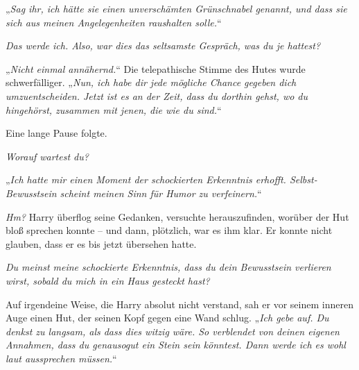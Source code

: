 „\emph{Sag ihr, ich hätte sie einen unverschämten Grünschnabel genannt, und dass sie sich aus meinen Angelegenheiten raushalten solle.}“

\emph{Das werde ich. Also, war dies das seltsamste Gespräch, was du je hattest? }

„\emph{Nicht einmal annähernd.}“ Die telepathische Stimme des Hutes wurde schwerfälliger. „\emph{Nun, ich habe dir jede mögliche Chance gegeben dich umzuentscheiden. Jetzt ist es an der Zeit, dass du dorthin gehst, wo du hingehörst, zusammen mit jenen, die wie du sind.}“

Eine lange Pause folgte.

\emph{Worauf wartest du? }

„\emph{Ich hatte mir einen Moment der schockierten Erkenntnis erhofft. Selbst-Bewusstsein scheint meinen Sinn für Humor zu verfeinern.}“

\emph{Hm?} Harry überflog seine Gedanken, versuchte herauszufinden, worüber der Hut bloß sprechen konnte – und dann, plötzlich, war es ihm klar. Er konnte nicht glauben, dass er es bis jetzt übersehen hatte.

\emph{Du meinst meine schockierte Erkenntnis, dass du dein Bewusstsein verlieren wirst, sobald du mich in ein Haus gesteckt hast?}

Auf irgendeine Weise, die Harry absolut nicht verstand, sah er vor seinem inneren Auge einen Hut, der seinen Kopf gegen eine Wand schlug. „\emph{Ich gebe auf. Du denkst zu langsam, als dass dies witzig wäre. So verblendet von deinen eigenen Annahmen, dass du genausogut ein Stein sein könntest. Dann werde ich es wohl laut aussprechen müssen.}“

